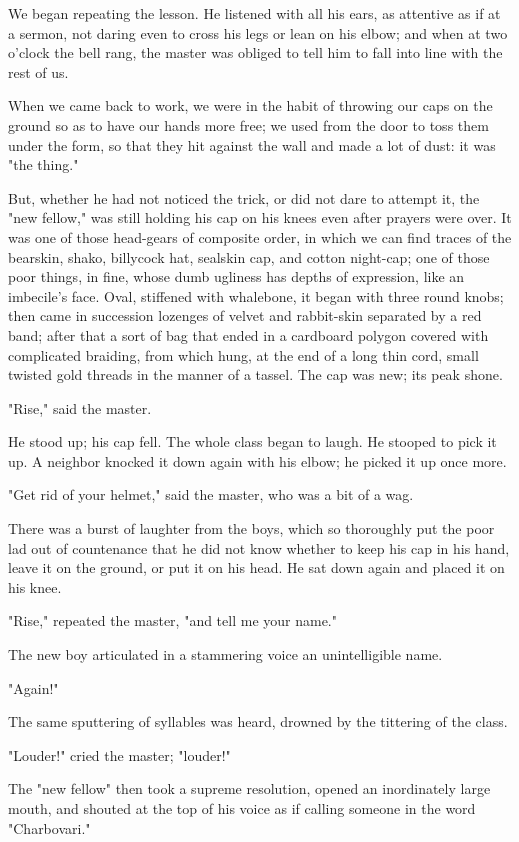 \documentclass{tufte-book}
\begin{document}
We began repeating the lesson. He listened with all his ears, as
attentive as if at a sermon, not daring even to cross his legs or lean
on his elbow; and when at two o'clock the bell rang, the master was
obliged to tell him to fall into line with the rest of us.

When we came back to work, we were in the habit of throwing our caps on
the ground so as to have our hands more free; we used from the door to
toss them under the form, so that they hit against the wall and made a
lot of dust: it was "the thing."

But, whether he had not noticed the trick, or did not dare to attempt
it, the "new fellow," was still holding his cap on his knees even after
prayers were over. It was one of those head-gears of composite order, in
which we can find traces of the bearskin, shako, billycock hat, sealskin
cap, and cotton night-cap; one of those poor things, in fine, whose
dumb ugliness has depths of expression, like an imbecile's face. Oval,
stiffened with whalebone, it began with three round knobs; then came in
succession lozenges of velvet and rabbit-skin separated by a red band;
after that a sort of bag that ended in a cardboard polygon covered with
complicated braiding, from which hung, at the end of a long thin cord,
small twisted gold threads in the manner of a tassel. The cap was new;
its peak shone.

"Rise," said the master.

He stood up; his cap fell. The whole class began to laugh. He stooped to
pick it up. A neighbor knocked it down again with his elbow; he picked
it up once more.

"Get rid of your helmet," said the master, who was a bit of a wag.

There was a burst of laughter from the boys, which so thoroughly put the
poor lad out of countenance that he did not know whether to keep his cap
in his hand, leave it on the ground, or put it on his head. He sat down
again and placed it on his knee.

"Rise," repeated the master, "and tell me your name."

The new boy articulated in a stammering voice an unintelligible name.

"Again!"

The same sputtering of syllables was heard, drowned by the tittering of
the class.

"Louder!" cried the master; "louder!"

The "new fellow" then took a supreme resolution, opened an inordinately
large mouth, and shouted at the top of his voice as if calling someone
in the word "Charbovari."
\end{document}
